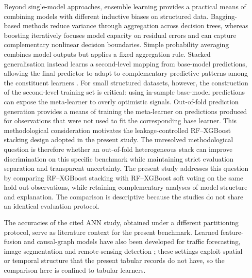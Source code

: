 \documentclass[a4paper,fleqn]{cas-dc}
\begin{document}
Beyond single-model approaches, ensemble learning provides a practical means of combining models with different inductive biases on structured data. Bagging-based methods reduce variance through aggregation across decision trees, whereas boosting iteratively focuses model capacity on residual errors and can capture complementary nonlinear decision boundaries. Simple probability averaging combines model outputs but applies a fixed aggregation rule. Stacked generalisation instead learns a second-level mapping from base-model predictions, allowing the final predictor to adapt to complementary predictive patterns among the constituent learners \cite{wolpert1992}. For small structured datasets, however, the construction of the second-level training set is critical: using in-sample base-model predictions can expose the meta-learner to overly optimistic signals. Out-of-fold prediction generation provides a means of training the meta-learner on predictions produced for observations that were not used to fit the corresponding base learner. This methodological consideration motivates the leakage-controlled RF--XGBoost stacking design adopted in the present study. The unresolved methodological question is therefore whether an out-of-fold heterogeneous stack can improve discrimination on this specific benchmark while maintaining strict evaluation separation and transparent uncertainty. The present study addresses this question by comparing RF--XGBoost stacking with RF--XGBoost soft voting on the same hold-out observations, while retaining complementary analyses of model structure and explanation. The comparison is descriptive because the studies do not share an identical evaluation protocol.

The accuracies of the cited ANN study, obtained under a different partitioning protocol, serve as literature context for the present benchmark. Learned feature-fusion and causal-graph models have also been developed for traffic forecasting, image segmentation and remote-sensing detection \cite{cao2025,teng2026,yin2025}; these settings exploit spatial or temporal structure that the present tabular records do not have, so the comparison here is confined to tabular learners.
\end{document}

